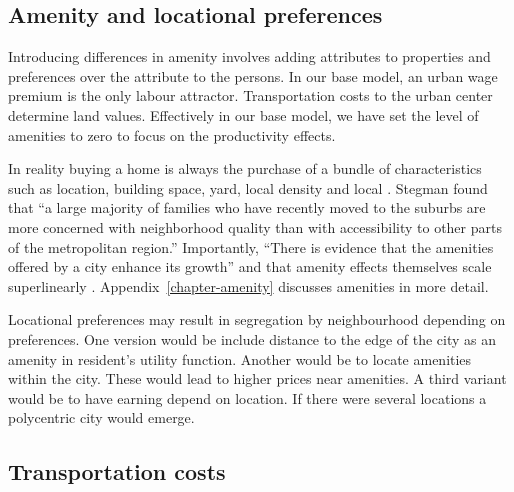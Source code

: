 
\subsection{Amenity and locational preferences}
Introducing differences in amenity involves  adding attributes to properties and preferences over the attribute to the persons. In our base model, an urban wage premium is the only labour attractor. Transportation costs to the urban center determine land values. Effectively in our base model, we have set the level of amenities to zero to focus on the productivity effects.

In reality buying a home is always the purchase of a bundle of characteristics such as location, building space, yard, local density and local . Stegman  found that ``a large majority of families who have recently moved to the suburbs are more concerned with neighborhood quality than with accessibility to other parts of the metropolitan region.'' Importantly, 
``There is evidence that the amenities offered by a city enhance its growth'' \cite{clarkAmenitiesDriveUrban2002, falckPhantomOperaCultural2011} and that amenity effects themselves scale superlinearly \cite{kraemerCulturalSustainabilityUS2022}.
Appendix~\ref{chapter-amenity} discusses amenities in more detail.

Locational preferences may result in segregation by neighbourhood depending on preferences. One version would be include distance to the edge of the city as an amenity in resident's utility function. Another would be to locate amenities within the city. These would lead to higher prices near amenities. A third variant would be to have earning depend on location. If there were several locations a polycentric city would emerge.



\subsection{Transportation costs} %

